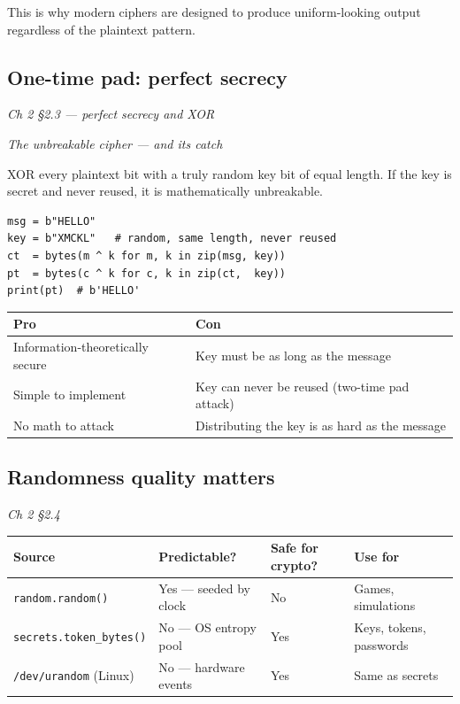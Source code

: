 \documentclass[12pt,openany]{book}
\begin{document}
This is why modern ciphers are designed to produce uniform-looking output regardless of the plaintext pattern.

\medskip

\subsection*{One-time pad: perfect secrecy}
{\small\itshape\color{gray}Ch 2 §2.3 --- perfect secrecy and XOR}

{\small\itshape\color{gray}The unbreakable cipher --- and its catch}

XOR every plaintext bit with a truly random key bit of equal length. If the key is secret and never reused, it is mathematically unbreakable.


\begin{lstlisting}
msg = b"HELLO"
key = b"XMCKL"   # random, same length, never reused
ct  = bytes(m ^ k for m, k in zip(msg, key))
pt  = bytes(c ^ k for c, k in zip(ct,  key))
print(pt)  # b'HELLO'\end{lstlisting}


\begin{center}\small\begin{tabular}{p{6.5cm}p{6.5cm}}\toprule
\textbf{Pro} & \textbf{Con} \\ \midrule
Information-theoretically secure & Key must be as long as the message \\
Simple to implement & Key can never be reused (two-time pad attack) \\
No math to attack & Distributing the key is as hard as the message \\
\bottomrule\end{tabular}\end{center}

\medskip

\subsection*{Randomness quality matters}
{\small\itshape\color{gray}Ch 2 §2.4}

\begin{center}\small\begin{tabular}{p{3.2cm}p{3.2cm}p{3.2cm}p{3.2cm}}\toprule
\textbf{Source} & \textbf{Predictable?} & \textbf{Safe for crypto?} & \textbf{Use for} \\ \midrule
\texttt{random.random()} & Yes --- seeded by clock & No & Games, simulations \\
\texttt{secrets.token\_bytes()} & No --- OS entropy pool & Yes & Keys, tokens, passwords \\
\texttt{/dev/urandom} (Linux) & No --- hardware events & Yes & Same as secrets \\
\bottomrule\end{tabular}\end{center}
\end{document}
